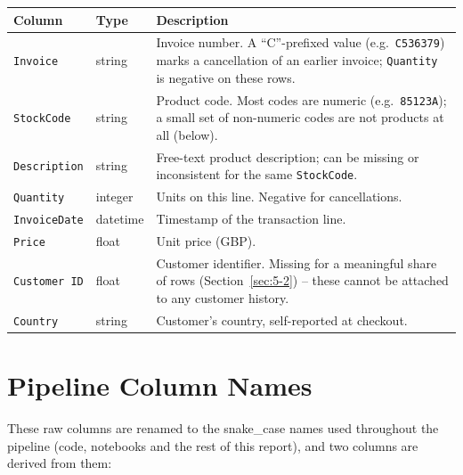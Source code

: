 \begin{center}
\begin{tabular}{@{}p{2.6cm}p{2cm}p{10cm}@{}}
    \toprule
    Column & Type & Description \\
    \midrule
    \texttt{Invoice} & string & Invoice number. A ``C''-prefixed value (e.g.\ \texttt{C536379}) marks a cancellation of an earlier invoice; \texttt{Quantity} is negative on these rows. \\
    \texttt{StockCode} & string & Product code. Most codes are numeric (e.g.\ \texttt{85123A}); a small set of non-numeric codes are not products at all (below). \\
    \texttt{Description} & string & Free-text product description; can be missing or inconsistent for the same \texttt{StockCode}. \\
    \texttt{Quantity} & integer & Units on this line. Negative for cancellations. \\
    \texttt{InvoiceDate} & datetime & Timestamp of the transaction line. \\
    \texttt{Price} & float & Unit price (GBP). \\
    \texttt{Customer ID} & float & Customer identifier. Missing for a meaningful share of rows (Section~\ref{sec:5-2}) -- these cannot be attached to any customer history. \\
    \texttt{Country} & string & Customer's country, self-reported at checkout. \\
    \bottomrule
\end{tabular}
\end{center}

\section{Pipeline Column Names}
\label{sec:3-4}

These raw columns are renamed to the snake\_case names used throughout the pipeline (code, notebooks and the rest of this report), and two columns are derived from them:

